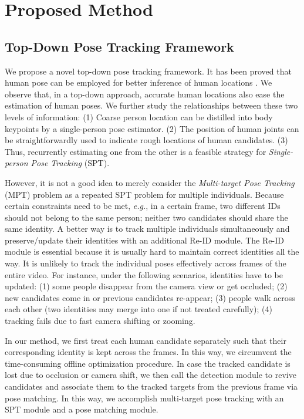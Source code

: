 \documentclass[10pt,twocolumn,letterpaper]{article}
\begin{document}
\section{Proposed Method}
	
	\subsection{Top-Down Pose Tracking Framework}
We propose a novel top-down pose tracking framework.
	It has been proved that human pose can be employed for better inference of human locations \cite{liu2018posehd}. We observe that, in a top-down approach, accurate human locations also ease the estimation of human poses. We further study the relationships between these two levels of information:
	(1)	Coarse person location can be distilled into body keypoints by a single-person pose estimator.
	(2)	The position of human joints can be straightforwardly used to indicate rough locations of human candidates. 
	(3)	Thus, recurrently estimating one from the other is  a feasible strategy for \textit{Single-person Pose Tracking} (SPT).  
	
	However, it is not a good idea to merely consider the \textit{Multi-target Pose Tracking} (MPT) problem as a repeated SPT problem for multiple individuals. Because certain constraints need to be met, \emph{e.g.}, in a certain frame, two different IDs should not belong to the same person; neither  two candidates should share the same identity. A better way is to track multiple individuals simultaneously and preserve/update their identities with an additional Re-ID module. 
	The Re-ID module is essential because it is usually hard to maintain correct identities all the way. It is unlikely to track the individual poses effectively across frames of the entire video. For instance, under the following scenarios, identities have to be updated: (1) some people disappear from the camera view or get occluded; (2) new candidates come in or previous candidates re-appear; (3) people walk across each other (two identities may merge into one if not treated carefully); (4) tracking fails due to fast camera shifting or zooming.
	
	In our method, we first treat each human candidate separately such that their corresponding identity is kept across the frames. In this way, we circumvent the time-consuming offline optimization procedure. In case the tracked candidate is lost due to occlusion or camera shift, we then call the detection module to revive candidates and associate them to the tracked targets from the previous frame via pose matching. In this way, we accomplish multi-target pose tracking with an SPT module and a pose matching module. 
	
\end{document}
